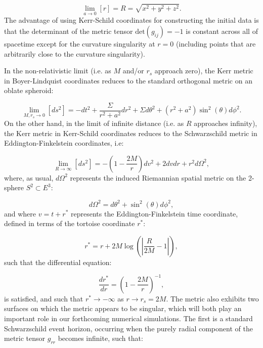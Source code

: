 \documentclass{article}
\begin{document}
\begin{equation}
\lim_{a \to 0} \left[ r \right] = R = \sqrt{x^2 + y^2 + z^2}.
\end{equation}
The advantage of using Kerr-Schild coordinates for constructing the initial data is that the determinant of the metric tensor ${\mathrm{det} \left( g_{i j} \right) = -1}$ is constant across all of spacetime except for the curvature singularity at ${r = 0}$ (including points that are arbitrarily close to the curvature singularity).

In the non-relativistic limit (i.e. as $M$ and/or ${r_s}$ approach zero), the Kerr metric in Boyer-Lindquist coordinates reduces to the standard orthogonal metric on an oblate spheroid:

\begin{equation}
\lim_{M, r_s \to 0} \left[ ds^2 \right] = -dt^2 + \frac{\Sigma}{r^2 + a^2} dr^2 + \Sigma d \theta^2 + \left( r^2 + a^2 \right) \sin^2 \left( \theta \right) d \phi^2.
\end{equation}
On the other hand, in the limit of infinite distance (i.e. as $R$ approaches infinity), the Kerr metric in Kerr-Schild coordinates reduces to the Schwarzschild metric in Eddington-Finkelstein coordinates, i.e:

\begin{equation}
\lim_{R \to \infty} \left[ ds^2 \right] = - \left( 1 - \frac{2M}{r} \right) dv^2 + 2 dv dr + r^2 d \Omega^2,
\end{equation}
where, as usual, ${d \Omega^2}$ represents the induced Riemannian spatial metric on the 2-sphere ${S^2 \subset E^3}$:

\begin{equation}
d \Omega^2 = d \theta^2 + \sin^2 \left( \theta \right) d \phi^2,
\end{equation}
and where ${v = t + r^{*}}$ represents the Eddington-Finkelstein time coordinate, defined in terms of the tortoise coordinate ${r^{*}}$:

\begin{equation}
r^{*} = r + 2 M \log \left( \left\lvert \frac{R}{2M} - 1 \right\rvert \right),
\end{equation}
such that the differential equation:

\begin{equation}
\frac{dr^{*}}{dr} = \left( 1 - \frac{2M}{r} \right)^{-1},
\end{equation}
is satisfied, and such that ${r^{*}\to -\infty}$ as ${r \to r_s = 2M}$. The metric also exhibits two surfaces on which the metric appears to be singular, which will both play an important role in our forthcoming numerical simulations. The first is a standard Schwarzschild event horizon, occurring when the purely radial component of the metric tensor ${g_{r r}}$ becomes infinite, such that:
\end{document}
